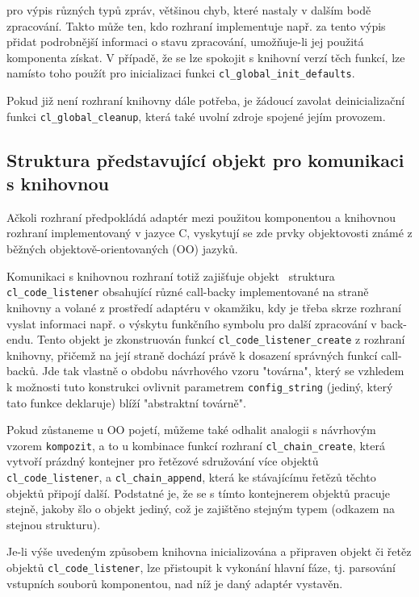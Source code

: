 pro výpis různých typů zpráv, většinou chyb, které nastaly v dalším
bodě zpracování. Takto může ten, kdo rozhraní implementuje
např. za tento výpis přidat podrobnější informaci o stavu zpracování,
umožňuje-li jej použitá komponenta získat. V případě, že se lze
spokojit s knihovní verzí těch funkcí, lze namísto toho
použít pro inicializaci funkci \texttt{cl\_global\_init\_defaults}.

Pokud již není rozhraní knihovny dále potřeba, je žádoucí
zavolat deinicializační funkci \texttt{cl\_global\_cleanup}, která také
uvolní zdroje spojené jejím provozem.

\subsection{Struktura představující objekt pro komunikaci s knihovnou}
\label{code-listener:objekt}
Ačkoli rozhraní předpokládá adaptér mezi použitou komponentou a knihovnou
rozhraní implementovaný v jazyce C, vyskytují se zde prvky
objektovosti známé z běžných objektově-orientovaných (OO) jazyků.

Komunikaci s knihovnou rozhraní totiž zajišťuje objekt \ndash\ struktura
\texttt{cl\_code\_listener} obsahující různé call-backy implementované
na straně knihovny a volané z prostředí adaptéru v okamžiku, kdy je třeba
skrze rozhraní vyslat informaci např. o výskytu funkčního symbolu pro
další zpracování v back-endu. Tento objekt je zkonstruován
funkcí%
\linebreak
\texttt{cl\_code\_listener\_create} z rozhraní knihovny, přičemž
na její straně dochází právě k dosazení správných funkcí call-backů.
Jde tak vlastně o obdobu návrhového vzoru "továrna", který se
vzhledem k možnosti tuto konstrukci ovlivnit parametrem
\texttt{config\_string} (jediný, který tato funkce deklaruje) blíží
"abstraktní továrně".

Pokud zůstaneme u OO pojetí, můžeme také odhalit analogii s návrhovým
vzorem \texttt{kompozit}, a to u kombinace funkcí
rozhraní \texttt{cl\_chain\_create}, která vytvoří prázdný kontejner
pro řetězové sdružování více objektů \texttt{cl\_code\_listener},
a \texttt{cl\_chain\_append}, která ke stávajícímu řetězů těchto
objektů připojí další. Podstatné je, že se s tímto kontejnerem
objektů pracuje stejně, jakoby šlo o objekt jediný, což je zajištěno
stejným typem (odkazem na stejnou strukturu).

Je-li výše uvedeným způsobem knihovna inicializována a připraven
objekt či řetěz objektů \texttt{cl\_code\_listener}, lze přistoupit
k vykonání hlavní fáze, tj. parsování vstupních souborů komponentou,
nad níž je daný adaptér vystavěn.


